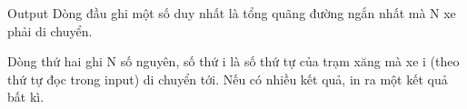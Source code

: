 Output
Dòng đầu ghi một số duy nhất là tổng quãng đường ngắn nhất mà N xe phải di chuyển.   


   Dòng thứ hai ghi N số nguyên, số thứ i là số thứ tự của trạm xăng mà xe i (theo thứ tự đọc trong input) di chuyển tới. Nếu có nhiều kết quả, in ra một kết quả bất kì.